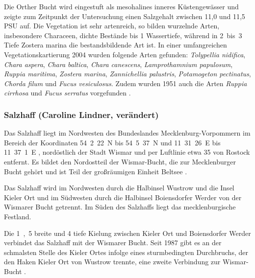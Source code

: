 Die Orther Bucht wird eingestuft als mesohalines inneres Küstengewässer \citep{reimers_2005} und zeigte zum Zeitpunkt der Untersuchung einen Salzgehalt zwischen 11,0 und 11,5 PSU auf.
Die Vegetation ist sehr artenreich, so bilden wurzelnde Arten, insbesondere Characeen, dichte Bestände bis \unit{1}{\metre} Wassertiefe, während in \unit{2 bis 3}{\metre} Tiefe Zostera marina die bestandsbildende Art ist. In einer umfangreichen Vegetationskartierung 2004 wurden folgende Arten gefunden: \textit{Tolypellia nidifica}, \textit{Chara aspera}, \textit{Chara baltica}, \textit{Chara canescens}, \textit{Lamprothamnium papulosum}, \textit{Ruppia maritima}, \textit{Zostera marina},\textit{ Zannichellia palustris}, \textit{Potamogeton pectinatus}, \textit{Chorda filum} und \textit{Fucus vesiculosus}. Zudem wurden 1951 auch die Arten \textit{Ruppia cirrhosa} und \textit{Fucus serratus} vorgefunden \citep{mertens_2007}.



\subsubsection{Salzhaff (Caroline Lindner, verändert)}

Das Salzhaff liegt im Nordwesten des Bundeslandes Mecklenburg-Vorpommern im Bereich der Koordinaten 54\textdegree\ 2\textquotesingle\ 22\dq\ N bis 54\textdegree\ 5\textquotesingle\ 37\dq\ N und 11\textdegree\ 31\textquotesingle\ 26\dq\ E bis 11\textdegree\ 37\textquotesingle\ 1\dq\ E \citep{nathansen_2014}, nordöstlich der Stadt Wismar und per Luftlinie etwa \unit{35}{\kilo\metre} von Rostock entfernt. Es bildet den Nordostteil der Wismar-Bucht, die zur Mecklenburger Bucht gehört und ist Teil der großräumigen Einheit Beltsee \cite{biele_1997}.

Das Salzhaff wird im Nordwesten durch die Halbinsel Wustrow und die Insel Kieler Ort und im Südwesten durch die Halbinsel Boiensdorfer Werder von der Wismarer Bucht getrennt. Im Süden des Salzhaffs liegt das mecklenburgische Festland.

Die \unit{1,5}{\kilo\metre} breite und \unit{4}{\metre} tiefe Kielung zwischen Kieler Ort und Boiensdorfer Werder verbindet das Salzhaff mit der Wismarer Bucht. Seit 1987 gibt es an der schmalsten Stelle des Kieler Ortes infolge eines sturmbedingten Durchbruchs, der den Haken Kieler Ort von Wustrow trennte, eine zweite Verbindung zur Wismar-Bucht \citep{kohn_1991}.

